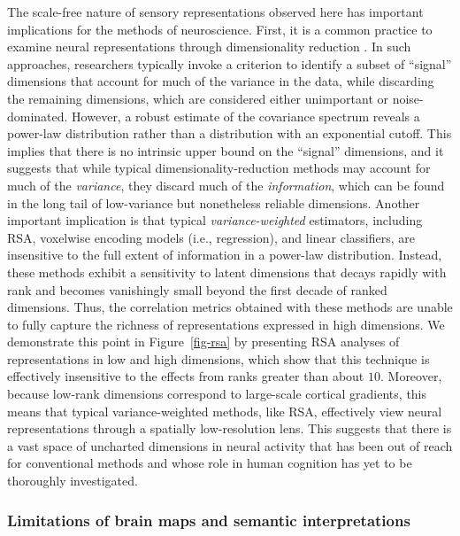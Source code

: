\documentclass[10pt]{article}
\begin{document}
The scale-free nature of sensory representations observed here has
important implications for the methods of neuroscience. First, it is a
common practice to examine neural representations through dimensionality
reduction
\autocite{Cunningham2014,Huth2012,Haxby2011,Khosla2022,Lehky2014}. In
such approaches, researchers typically invoke a criterion to identify a
subset of ``signal'' dimensions that account for much of the variance in
the data, while discarding the remaining dimensions, which are
considered either unimportant or noise-dominated. However, a robust
estimate of the covariance spectrum reveals a power-law distribution
rather than a distribution with an exponential cutoff. This implies that
there is no intrinsic upper bound on the ``signal'' dimensions, and it
suggests that while typical dimensionality-reduction methods may account
for much of the \emph{variance}, they discard much of the
\emph{information}, which can be found in the long tail of low-variance
but nonetheless reliable dimensions. Another important implication is
that typical \emph{variance-weighted} estimators, including RSA,
voxelwise encoding models (i.e., regression), and linear classifiers,
are insensitive to the full extent of information in a power-law
distribution. Instead, these methods exhibit a sensitivity to latent
dimensions that decays rapidly with rank and becomes vanishingly small
beyond the first decade of ranked dimensions. Thus, the correlation
metrics obtained with these methods are unable to fully capture the
richness of representations expressed in high dimensions. We demonstrate
this point in Figure~\ref{fig-rsa} by presenting RSA analyses of
representations in low and high dimensions, which show that this
technique is effectively insensitive to the effects from ranks greater
than about \(10\). Moreover, because low-rank dimensions correspond to
large-scale cortical gradients, this means that typical
variance-weighted methods, like RSA, effectively view neural
representations through a spatially low-resolution lens. This suggests
that there is a vast space of uncharted dimensions in neural activity
that has been out of reach for conventional methods and whose role in
human cognition has yet to be thoroughly investigated.

\subsubsection{Limitations of brain maps and semantic
interpretations}\label{limitations-of-brain-maps-and-semantic-interpretations}
\end{document}
